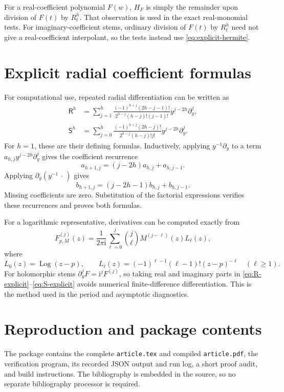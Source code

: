 \documentclass[11pt,a4paper]{article}
\numberwithin{equation}{section}
\theoremstyle{definition}
\theoremstyle{remark}
\newcommand{\ii}{\mathrm i}
\newcommand{\Rop}{\mathsf R}
\newcommand{\Sop}{\mathsf S}
\begin{document}
For a real-coefficient polynomial $F(w)$, $H_F$ is simply the remainder upon
division of $F(t)$ by $R_t^h$. That observation is used in the exact
real-monomial tests. For imaginary-coefficient stems, ordinary division of
$F(t)$ by $R_t^h$ need not give a real-coefficient interpolant, so the tests
instead use \eqref{eq:explicit-hermite}.

\section{Explicit radial coefficient formulas}
\label{app:radial}

For computational use, repeated radial differentiation can be written as
\begin{align}
 \Rop^h
 &=\sum_{j=1}^h
 \frac{(-1)^{h+j}(2h-j-1)!}{2^{h-j}(h-j)!(j-1)!}
 y^{j-2h}\partial_y^j,\label{eq:R-explicit}\\
 \Sop^h
 &=\sum_{j=0}^h
 \frac{(-1)^{h+j}(2h-j)!}{2^{h-j}(h-j)!j!}
 y^{j-2h}\partial_y^j.\label{eq:S-explicit}
\end{align}
For $h=1$, these are their defining formulas. Inductively, applying
$y^{-1}\partial_y$ to a term $a_{h,j}y^{j-2h}\partial_y^j$ gives the
coefficient recurrence
\[
 a_{h+1,j}=(j-2h)a_{h,j}+a_{h,j-1}.
\]
Applying $\partial_y(y^{-1}\,\cdot\,)$ gives
\[
 b_{h+1,j}=(j-2h-1)b_{h,j}+b_{h,j-1}.
\]
Missing coefficients are zero. Substitution of the factorial expressions
verifies these recurrences and proves both formulas.

For a logarithmic representative, derivatives can be computed exactly from
\begin{equation}\label{eq:log-jets-algorithm}
 F_{p,M}^{(j)}(z)=\frac1{2\pi\ii}
 \sum_{\ell=0}^j\binom j\ell M^{(j-\ell)}(z)L_\ell(z),
\end{equation}
where
\[
 L_0(z)=\operatorname{Log}(z-p),\qquad
 L_\ell(z)=(-1)^{\ell-1}(\ell-1)!(z-p)^{-\ell}\quad(\ell\ge1).
\]
For holomorphic stems $\partial_y^jF=\ii^jF^{(j)}$, so taking real and imaginary
parts in \eqref{eq:R-explicit}--\eqref{eq:S-explicit} avoids numerical
finite-difference differentiation. This is the method used in the period and
asymptotic diagnostics.

\section{Reproduction and package contents}

The package contains the complete \texttt{article.tex} and compiled
\texttt{article.pdf}, the verification program, its recorded JSON output and
run log, a short proof audit, and build instructions. The bibliography is
embedded in the source, so no separate bibliography processor is required.
\end{document}
